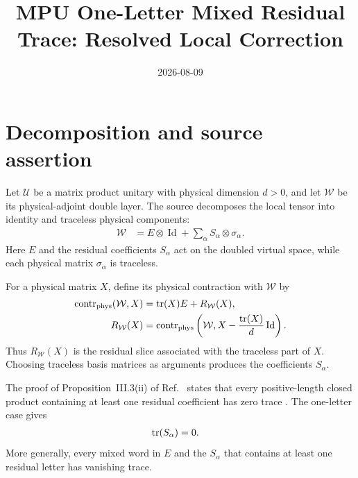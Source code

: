 \documentclass{article}
\title{MPU One-Letter Mixed Residual Trace: Resolved Local Correction}
\author{}
\date{2026-08-09}
\begin{document}
\maketitle
{}

\section{Decomposition and source assertion}

Let $\mathcal U$ be a matrix product unitary with physical dimension $d>0$,
and let $\mathcal W$ be its physical-adjoint double layer. The source
decomposes the local tensor into identity and traceless physical components:
\begin{align}
    \mathcal W
        &=E\otimes\operatorname{Id}
          +\sum_\alpha S_\alpha\otimes\sigma_\alpha.
    \label{eq:mpu_one_letter_mixed_residual_trace_identity_traceless_decomposition}
\end{align}
Here $E$ and the residual coefficients $S_\alpha$ act on the doubled virtual
space, while each physical matrix $\sigma_\alpha$ is traceless.

For a physical matrix $X$, define its physical contraction with
$\mathcal W$ by
\begin{align}
    \operatorname{contr}_{\mathrm{phys}}(\mathcal W,X)
        &=\operatorname{tr}(X)E+R_{\mathcal W}(X),
    \label{eq:mpu_one_letter_mixed_residual_trace_contraction_decomposition}\\
    R_{\mathcal W}(X)
        &=\operatorname{contr}_{\mathrm{phys}}
          \left(\mathcal W,
              X-\frac{\operatorname{tr}(X)}{d}\operatorname{Id}\right).
    \label{eq:mpu_one_letter_mixed_residual_trace_residual_slice}
\end{align}
Thus $R_{\mathcal W}(X)$ is the residual slice associated with the traceless
part of $X$. Choosing traceless basis matrices as arguments produces the
coefficients $S_\alpha$.

The proof of Proposition~III.3(ii) of
Ref.~\cite{Cirac2017MPU} states that every positive-length closed product
containing at least one residual coefficient has zero trace
\cite[lines~405--409]{Cirac2017MPU}. The one-letter case gives
\begin{align}
    \operatorname{tr}(S_\alpha) &= 0.
    \label{eq:mpu_one_letter_mixed_residual_trace_single_coefficient}
\end{align}
More generally, every mixed word in $E$ and the $S_\alpha$ that contains at
least one residual letter has vanishing trace.
\end{document}
